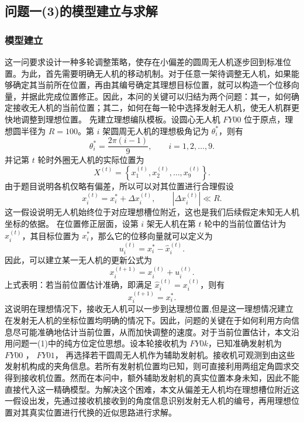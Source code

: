 \documentclass[UTF-8,a4paper,zihao=-4]{ctexart}
\begin{document}
\subsection{问题一(3)的模型建立与求解}
\subsubsection{模型建立}
这一问要求设计一种多轮调整策略，使存在小偏差的圆周无人机逐步回到标准位置。为此，首先需要明确无人机的移动机制。对于任意一架待调整无人机，如果能够确定其当前所在位置，再由其编号确定其理想目标位置，就可以构造一个位移向量，并据此完成位置修正。因此，本问的关键可以归结为两个问题：其一，如何确定接收无人机的当前位置；其二，如何在每一轮中选择发射无人机，使无人机群更快地调整到理想位置。
\vspace{0.5em}
先建立理想编队模板。设圆心无人机 $FY00$ 位于原点，理想圆半径为 $R=100$。第 $i$ 架圆周无人机的理想极角记为 $\theta_i^{*}$，则有
\begin{equation}
\theta_i^{*}=\frac{2\pi(i-1)}{9}, \qquad i=1,2,\dots,9.
\end{equation}
并记第 $t$ 轮时外圈无人机的实际位置为
\begin{equation}
X^{(t)}=\left\{x_1^{(t)},x_2^{(t)},\dots,x_9^{(t)}\right\}.
\end{equation}
由于题目说明各机仅略有偏差，所以可以对其位置进行合理假设
\begin{equation}
x_i^{(t)}=x_i^{*}+\Delta x_i^{(t)}, \qquad \left|\Delta x_i^{(t)}\right|\ll R.
\end{equation}
这一假设说明无人机始终位于对应理想槽位附近，这也是我们后续假定未知无人机坐标的依据。
\vspace{0.5em}
在位置修正层面，设第 $i$ 架无人机在第 $t$ 轮中的当前位置估计为 $\hat{x}_i^{(t)}$，其目标位置为 $x_i^{*}$，那么它的位移向量就可以定义为
\begin{equation}
u_i^{(t)}=x_i^{*}-\hat{x}_i^{(t)}.
\end{equation}
因此，可以建立某一无人机的更新公式为
\begin{equation}
x_i^{(t+1)}=x_i^{(t)}+u_i^{(t)}.
\end{equation}
上式表明：若当前位置估计准确，即满足 $\hat{x}_i^{(t)}=x_i^{(t)}$，则有
\begin{equation}
x_i^{(t+1)}=x_i^{*}.
\end{equation}
这说明在理想情况下，接收无人机可以一步到达理想位置,但是这一理想情况建立在发射无人机的坐标位置均明确的情况下。因此，问题的关键在于如何利用方向信息尽可能准确地估计当前位置，从而加快调整的速度。对于当前位置估计，本文沿用问题一(1)中的纯方位定位思想。设本轮接收机为 $FY0k$，已知准确发射机为 $FY00$ ， $FY01$， 再选择若干圆周无人机作为辅助发射机。接收机可观测到由这些发射机构成的夹角信息。若所有发射机位置均已知，则可直接利用两组定角圆求交得到接收机位置。然而在本问中，额外辅助发射机的真实位置本身未知，因此不能直接代入这一精确模型。为解决这个困难，本文从偏差无人机均在理想槽位附近这一假设出发，先通过接收机接收到的角度信息识别发射无人机的编号，再用理想位置对其真实位置进行代换的近似思路进行求解。
\end{document}

